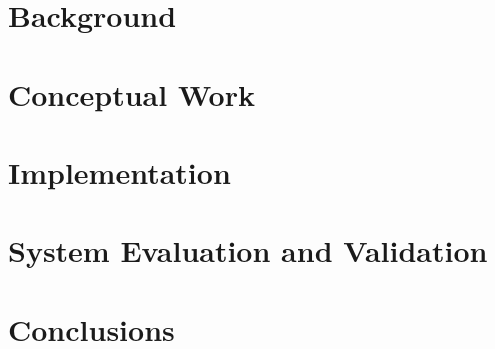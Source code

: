 \documentclass{Configuration_Files/PoliMi3i_thesis}
\begin{document}
\chapter{Background}


\chapter{Conceptual Work}


\chapter{Implementation}













\chapter{System Evaluation and Validation}


\chapter{Conclusions}


% 



\end{document}
